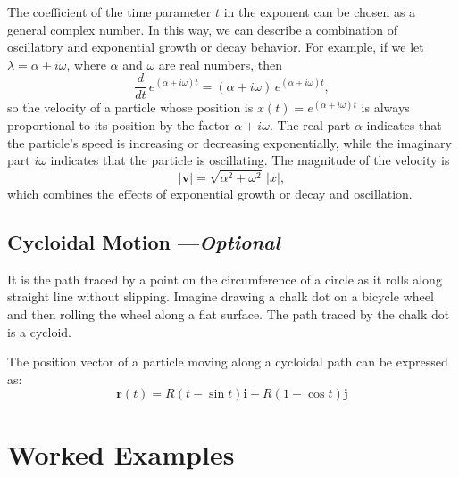 \documentclass[12pt]{article}
\theoremstyle{remark}
\begin{document}
The coefficient of the time parameter $t$ in the exponent can be chosen as a general complex number. In this way, we can describe a combination of oscillatory and exponential growth or decay behavior. For example, if we let $\lambda = \alpha + i\omega$, where $\alpha$ and $\omega$ are real numbers, then
\begin{equation}
    \frac{d}{dt}\,e^{(\alpha+i\omega) t}
      = (\alpha+i\omega)\,e^{(\alpha+i\omega) t},
\end{equation}
so the velocity of a particle whose position is $x(t)=e^{(\alpha+i\omega) t}$ is always proportional to its position by the factor $\alpha+i\omega$. The real part $\alpha$ indicates that the particle's speed is increasing or decreasing exponentially, while the imaginary part $i\omega$ indicates that the particle is oscillating. The magnitude of the velocity is
\begin{equation}
    |\mathbf{v}| = \sqrt{\alpha^2+\omega^2}\,|x|,
\end{equation}
which combines the effects of exponential growth or decay and oscillation.














\subsection{Cycloidal Motion ---\textit{Optional}}
It is the path traced by a point on the circumference of a circle as it rolls along straight line without slipping. Imagine drawing a chalk dot on a bicycle wheel and then rolling the wheel along a flat surface. The path traced by the chalk dot is a cycloid. 

The position vector of a particle moving along a cycloidal path can be expressed as:
\[
\mathbf{r}(t) = R(t - \sin t)\mathbf{i} + R(1 - \cos t)\mathbf{j}
\]







\section{Worked Examples}
\end{document}
